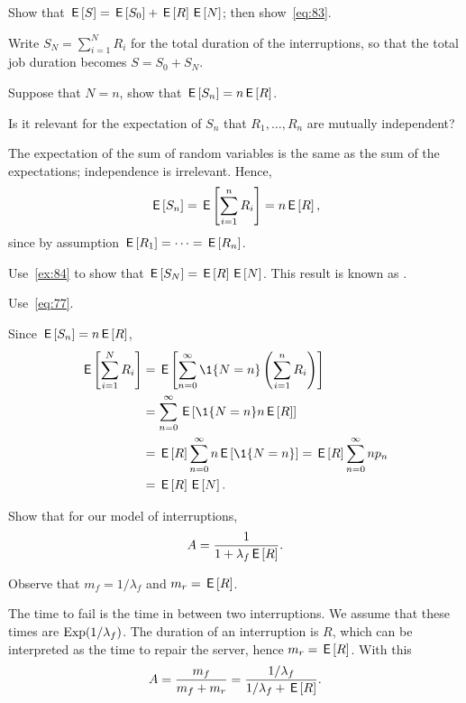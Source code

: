 \begin{exercise}
 Show that $\,\mathsf{E}\left[S\right] = \,\mathsf{E}\left[S_0\right] + \,\mathsf{E}\left[R\right] \,\mathsf{E}\left[N\right]$; then show~\cref{eq:83}.
\begin{solution}
Write $S_N = \sum_{i=1}^N R_i$ for the total duration of the interruptions, so that the total job duration becomes $S = S_0 + S_N$. 

\end{solution}
\end{exercise}


\begin{extra}
 Suppose that $N=n$, show that $\,\mathsf{E}\left[S_n\right]=n\,\mathsf{E}\left[R\right]$.
\begin{hint}
 Is it relevant for the expectation of $S_n$ that $R_1,\ldots, R_n$ are mutually independent?
\end{hint}
\begin{solution}
The expectation of the sum of random variables is the same as the sum of the expectations; independence is irrelevant. Hence,
\begin{equation*}
 \,\mathsf{E}\left[S_n \right] = \,\mathsf{E}\left[\sum_{i=1}^n R_i\right]= n \,\mathsf{E}\left[R\right], 
\end{equation*}
since by assumption $\,\mathsf{E}\left[R_1\right] = \cdots = \,\mathsf{E}\left[R_n\right]$. 
\end{solution}
\end{extra}


\begin{extra}
 Use~\cref{ex:84} to show that $\,\mathsf{E}\left[S_N\right]=\,\mathsf{E}\left[R\right] \,\mathsf{E}\left[N\right]$.
 This result is known as .
\begin{hint}
 Use~\cref{eq:77}. 
\end{hint}
\begin{solution}
Since $\,\mathsf{E}\left[S_n\right] = n \,\mathsf{E}\left[R\right]$, 
\begin{align*}
 \E{\sum_{i=1}^N R_i} 
&= \E{ \sum_{n=0}^\infty \1{N=n} \left(\sum_{i=1}^n R_i \right)} \\
&= \sum_{n=0}^\infty \E{\1{N=n} n\E{R}} \\
&= \E{R} \sum_{n=0}^\infty n \E{\1{N=n}} = \E R \sum_{n=0}^\infty n p_n\\
&= \E R \E N.
\end{align*}
\end{solution}
\end{extra}


\begin{extra}
 Show that for our model of interruptions,
 \begin{equation*}
A=\frac 1{1+\lambda_f \,\mathsf{E}\left[R\right]}.
 \end{equation*}
\begin{hint}
 Observe that $m_f = 1/\lambda_f$ and $m_r = \,\mathsf{E}\left[R\right]$.
\end{hint}
\begin{solution}
The time to fail is the time in between two interruptions. We assume that these times are $\operatorname{Exp}(1/\lambda_f)$. The duration of an interruption is $R$, which can be interpreted as the time to repair the server, hence $m_r = \,\mathsf{E}\left[R\right]$. With this
\begin{equation*}
 A=\frac{m_f}{m_f + m_r}=\frac{1/\lambda_f }{1/\lambda_f + \,\mathsf{E}\left[R\right]}. 
\end{equation*}
\end{solution}
\end{extra}


